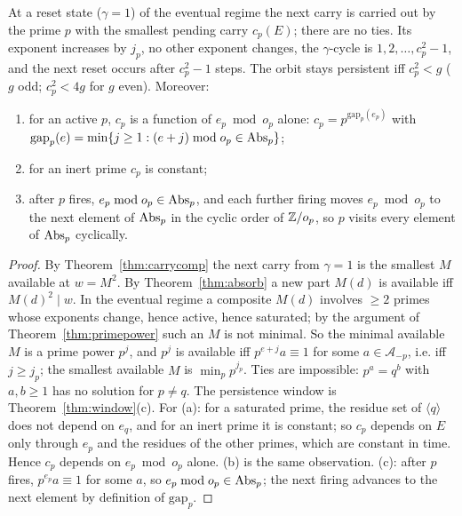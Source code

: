 \begin{theorem}\label{thm:scheduler}
At a reset state (\(\gamma=1\)) of the eventual regime the next carry is carried out by the prime \(p\) with the smallest pending carry \(c_p(E)\); there are no ties. Its exponent increases by \(j_p\), no other exponent changes, the \(\gamma\)-cycle is \(1,2,\dots,c_p^2-1\), and the next reset occurs after \(c_p^2-1\) steps. The orbit stays persistent iff \(c_p^2<g\) (\(g\) odd; \(c_p^2<4g\) for \(g\) even). Moreover:
\begin{enumerate}[label=(\alph*),nosep]
\item for an active \(p\), \(c_p\) is a function of \(e_p\bmod o_p\) alone: \(c_p=p^{\mathrm{gap}_p(e_p)}\) with \(\mathrm{gap}_p(e)=\min\{j\ge1:(e+j)\bmod o_p\in\operatorname{Abs}_p\}\);
\item for an inert prime \(c_p\) is constant;
\item after \(p\) fires, \(e_p\bmod o_p\in\operatorname{Abs}_p\), and each further firing moves \(e_p\bmod o_p\) to the next element of \(\operatorname{Abs}_p\) in the cyclic order of \(\mathbb{Z}/o_p\), so \(p\) visits every element of \(\operatorname{Abs}_p\) cyclically.
\end{enumerate}
\end{theorem}
\begin{proof}
By Theorem~\ref{thm:carrycomp} the next carry from \(\gamma=1\) is the smallest \(M\) available at \(w=M^2\). By Theorem~\ref{thm:absorb} a new part \(M(d)\) is available iff \(M(d)^2\mid w\). In the eventual regime a composite \(M(d)\) involves \(\ge2\) primes whose exponents change, hence active, hence saturated; by the argument of Theorem~\ref{thm:primepower} such an \(M\) is not minimal. So the minimal available \(M\) is a prime power \(p^j\), and \(p^j\) is available iff \(p^{e+j}a\equiv1\) for some \(a\in\mathcal A_{-p}\), i.e. iff \(j\ge j_p\); the smallest available \(M\) is \(\min_pp^{j_p}\). Ties are impossible: \(p^a=q^b\) with \(a,b\ge1\) has no solution for \(p\ne q\). The persistence window is Theorem~\ref{thm:window}(c). For (a): for a saturated prime, the residue set of \(\langle q\rangle\) does not depend on \(e_q\), and for an inert prime it is constant; so \(c_p\) depends on \(E\) only through \(e_p\) and the residues of the other primes, which are constant in time. Hence \(c_p\) depends on \(e_p\bmod o_p\) alone. (b) is the same observation. (c): after \(p\) fires, \(p^{e_p}a\equiv1\) for some \(a\), so \(e_p\bmod o_p\in\operatorname{Abs}_p\); the next firing advances to the next element by definition of \(\mathrm{gap}_p\).
\end{proof}

